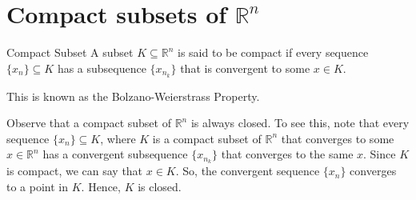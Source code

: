 \documentclass[a4paper]{article}
\begin{document}

\section{Compact subsets of $\mathbb{R}^n$}

\begin{Def}{Compact Subset}{}
  A subset $K \subseteq \mathbb{R}^n$ is said to be compact if every sequence $\{x_n\} \subseteq K$ has a subsequence $\{x_{n_k}\}$ that is convergent to some $x \in K$.
\end{Def}

This is known as the Bolzano-Weierstrass Property.

Observe that a compact subset of $\mathbb{R}^n$ is always closed. To see this, note that every sequence $\{x_n\} \subseteq K$, where $K$ is a compact subset of $\mathbb{R}^n$ that converges to some $x \in \mathbb{R}^n$ has a convergent subsequence $\{x_{n_k}\}$ that converges to the same $x$. Since $K$ is compact, we can say that $x \in K$. So, the convergent sequence $\{x_n\}$ converges to a point in $K$. Hence, $K$ is closed.
\end{document}
